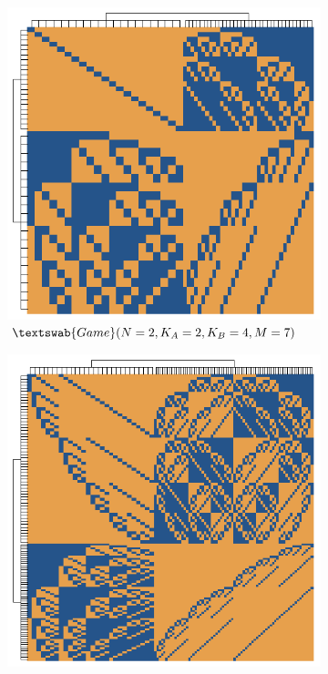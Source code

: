 \documentclass{beamer}
\theoremstyle{definition}
\newcommand{\G}[1]{$\textswab{Game}(#1)$}
\begin{document}
\begin{frame}{}

\begin{figure}[H]
    \centering
    \begin{subfigure}[b]{0.45\textwidth}
        \includegraphics[width=\textwidth]{img/StrategyPlot_2_2_4_7.pdf}
        \caption{\small \centering \G{N=2,K_A=2,K_B=4,M=7}}
        \label{fig:StrategyPlot_G_2_2_4_7}
    \end{subfigure}
    \hspace{0.05\textwidth} %
    \begin{subfigure}[b]{0.45\textwidth}
        \includegraphics[width=\textwidth]{img/StrategyPlot_3_2_4_8.pdf}

\end{subfigure}
\end{figure}
\end{frame}
\end{document}
